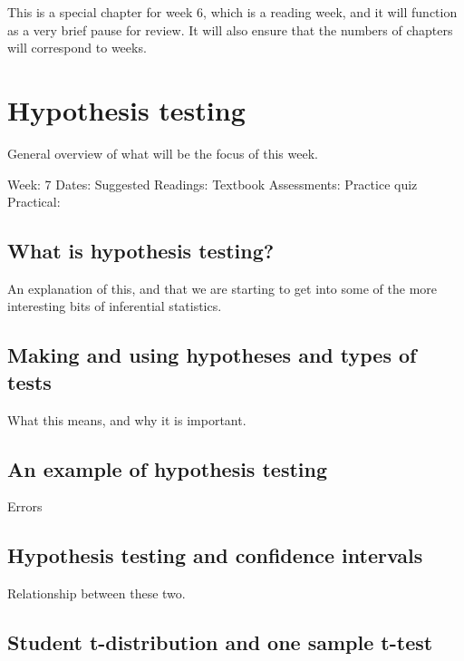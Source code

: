 \documentclass[
]{book}
\begin{document}
This is a special chapter for week 6, which is a reading week, and it will function as a very brief pause for review. It will also ensure that the numbers of chapters will correspond to weeks.

\hypertarget{part-hypothesis-testing}{%
\part{Hypothesis testing}\label{part-hypothesis-testing}}

General overview of what will be the focus of this week.

Week: 7
Dates:
Suggested Readings: Textbook
Assessments: Practice quiz
Practical:

\hypertarget{what-is-hypothesis-testing}{%
\chapter{What is hypothesis testing?}\label{what-is-hypothesis-testing}}

An explanation of this, and that we are starting to get into some of the more interesting bits of inferential statistics.

\hypertarget{making-and-using-hypotheses-and-types-of-tests}{%
\chapter{Making and using hypotheses and types of tests}\label{making-and-using-hypotheses-and-types-of-tests}}

What this means, and why it is important.

\hypertarget{an-example-of-hypothesis-testing}{%
\chapter{An example of hypothesis testing}\label{an-example-of-hypothesis-testing}}

Errors

\hypertarget{hypothesis-testing-and-confidence-intervals}{%
\chapter{Hypothesis testing and confidence intervals}\label{hypothesis-testing-and-confidence-intervals}}

Relationship between these two.

\hypertarget{student-t-distribution-and-one-sample-t-test}{%
\chapter{Student t-distribution and one sample t-test}\label{student-t-distribution-and-one-sample-t-test}}
\end{document}
